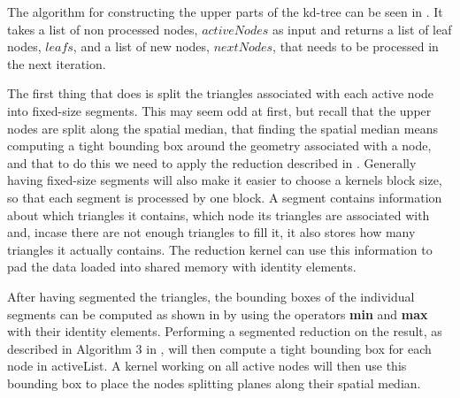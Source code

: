 \begin{algorithm}
\begin{algorithmic}
{                 \STATE{}


                   \ELSE
                   \ENDIF
                 \ENDFOR
  }
  \end{algorithmic}
\end{algorithm}


The algorithm for constructing the upper parts of the kd-tree can be
seen in . It takes a list of non
processed nodes, $activeNodes$ as input and returns a list of leaf
nodes, $leafs$, and a list of new nodes, $nextNodes$, that needs to be
processed in the next iteration.



The first thing that  does is split the triangles
associated with each active node into fixed-size segments. This may seem odd at
first, but recall that the upper nodes are split along the spatial median, that
finding the spatial median means computing a tight bounding box around the
geometry associated with a node, and that to do this we need to apply the
reduction described in . Generally having fixed-size
segments will also make it easier to choose a kernels block size, so that each
segment is processed by one block. A segment contains information about which
triangles it contains, which node its triangles are associated with and, incase
there are not enough triangles to fill it, it also stores how many triangles it
actually contains. The reduction kernel can use this information to pad the data
loaded into shared memory with identity elements.

After having segmented the triangles, the bounding boxes of the individual
segments can be computed as shown in  by using the
operators \textbf{min} and \textbf{max} with their identity elements.
Performing a segmented reduction on the result, as described in Algorithm 3 in
\zhou, will then compute a tight bounding box for each node in activeList. A
kernel working on all active nodes will then use this bounding box to place the
nodes splitting planes along their spatial median.

